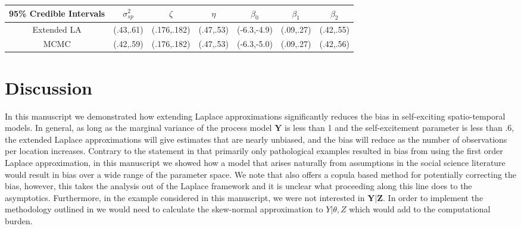 \documentclass[11pt]{isuthesis}
\begin{document}
	\begin{table}[h]
		\begin{center}
			\begin{tabular}{ |c|c|c|c|c|c|c| } 
				\hline
				95\% Credible Intervals & $\sigma_{sp}^2$ & $\zeta$ & $\eta$ & $\beta_0$ & $\beta_1$ & $\beta_2$\\
				\hline 
				Extended LA & (.43,.61) & (.176,.182) &(.47,.53)& (-6.3,-4.9) & (.09,.27) & (.42,.55)\\
				MCMC & (.42,.59) & (.176,.182) & (.47,.53) & (-6.3,-5.0) & (.09,.27) & (.42,.56)\\
				\hline
			\end{tabular}
		\end{center}
		\label{Table:Results2}
	\end{table}
	
	\newpage
	\section{Discussion}
	In this manuscript we demonstrated how extending Laplace approximations significantly reduces the bias in self-exciting spatio-temporal models.  In general, as long as the marginal variance of the process model $\boldsymbol{Y}$ is less than 1 and the self-excitement parameter is less than .6, the extended Laplace approximations will give estimates that are nearly unbiased, and the bias will reduce as the number of observations per location increases.  Contrary to the statement in \cite{rue2009approximate} that primarily only pathological examples resulted in bias from using the first order Laplace approximation, in this manuscript we showed how a model that arises naturally from assumptions in the social science literature would result in bias over a wide range of the parameter space.  We note that \cite{ferkingstad2015improving} also offers a copula based method for potentially correcting the bias, however, this takes the analysis out of the Laplace framework and it is unclear what proceeding along this line does to the asymptotics.  Furthermore, in the example considered in this manuscript, we were not interested in $\boldsymbol{Y}|\boldsymbol{Z}$.  In order to implement the methodology outlined in \cite{ferkingstad2015improving} we would need to calculate the skew-normal approximation to $Y|\theta,Z$ which would add to the computational burden.
	
\end{document}
